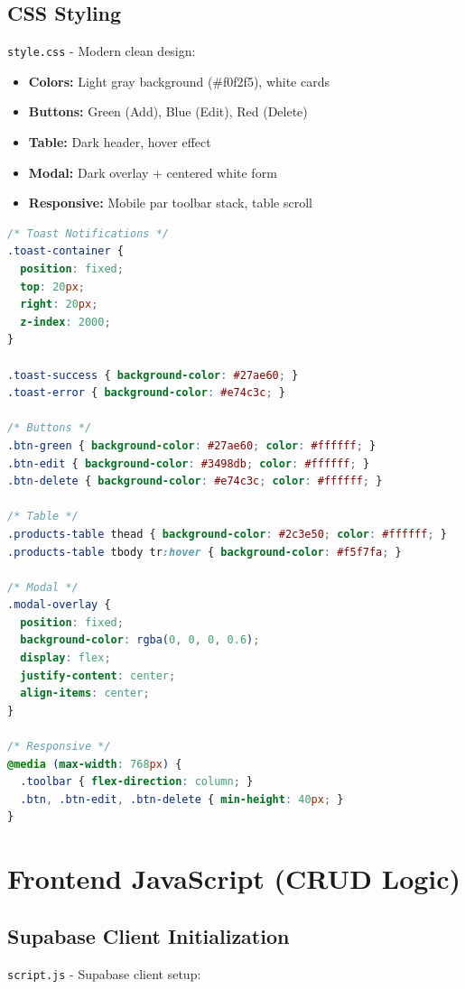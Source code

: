 \documentclass[12pt,a4paper]{article}
\begin{document}
\subsection{CSS Styling}
\texttt{style.css} - Modern clean design:

\begin{itemize}[leftmargin=2em]
    \item \textbf{Colors:} Light gray background (\#f0f2f5), white cards
    \item \textbf{Buttons:} Green (Add), Blue (Edit), Red (Delete)
    \item \textbf{Table:} Dark header, hover effect
    \item \textbf{Modal:} Dark overlay + centered white form
    \item \textbf{Responsive:} Mobile par toolbar stack, table scroll
\end{itemize}

\begin{lstlisting}[language=CSS, caption={style.css - Key Styles}]
/* Toast Notifications */
.toast-container {
  position: fixed;
  top: 20px;
  right: 20px;
  z-index: 2000;
}

.toast-success { background-color: #27ae60; }
.toast-error { background-color: #e74c3c; }

/* Buttons */
.btn-green { background-color: #27ae60; color: #ffffff; }
.btn-edit { background-color: #3498db; color: #ffffff; }
.btn-delete { background-color: #e74c3c; color: #ffffff; }

/* Table */
.products-table thead { background-color: #2c3e50; color: #ffffff; }
.products-table tbody tr:hover { background-color: #f5f7fa; }

/* Modal */
.modal-overlay {
  position: fixed;
  background-color: rgba(0, 0, 0, 0.6);
  display: flex;
  justify-content: center;
  align-items: center;
}

/* Responsive */
@media (max-width: 768px) {
  .toolbar { flex-direction: column; }
  .btn, .btn-edit, .btn-delete { min-height: 40px; }
}
\end{lstlisting}

\section{Frontend JavaScript (CRUD Logic)}
\label{sec:js}

\subsection{Supabase Client Initialization}
\texttt{script.js} - Supabase client setup:
\end{document}
